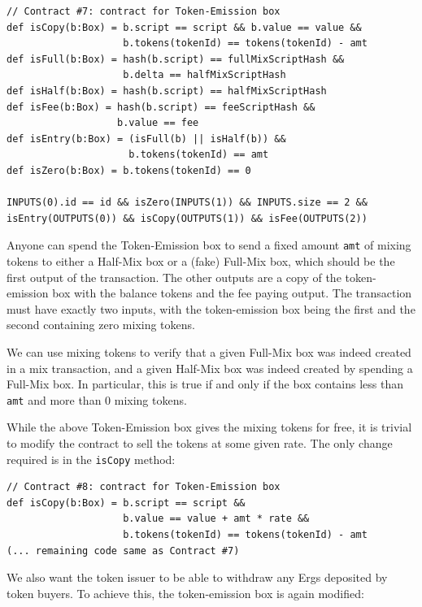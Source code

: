 \documentclass[11pt]{article}
\begin{document}
{\small
\begin{Verbatim}[frame=single]
// Contract #7: contract for Token-Emission box
def isCopy(b:Box) = b.script == script && b.value == value &&
                    b.tokens(tokenId) == tokens(tokenId) - amt
def isFull(b:Box) = hash(b.script) == fullMixScriptHash && 
                    b.delta == halfMixScriptHash
def isHalf(b:Box) = hash(b.script) == halfMixScriptHash
def isFee(b:Box) = hash(b.script) == feeScriptHash &&
                   b.value == fee
def isEntry(b:Box) = (isFull(b) || isHalf(b)) && 
                     b.tokens(tokenId) == amt
def isZero(b:Box) = b.tokens(tokenId) == 0

INPUTS(0).id == id && isZero(INPUTS(1)) && INPUTS.size == 2 &&
isEntry(OUTPUTS(0)) && isCopy(OUTPUTS(1)) && isFee(OUTPUTS(2))
\end{Verbatim}
}

Anyone can spend the Token-Emission box to send a fixed amount \texttt{amt} of mixing tokens to either a Half-Mix box or a (fake) Full-Mix box, which should be the first output of the transaction. The other outputs are a copy of the token-emission box with the balance tokens and the fee paying output. The transaction must have exactly two inputs, with the token-emission box being the first and the second containing zero mixing tokens. 

We can use mixing tokens to verify that a given Full-Mix box was indeed created in a mix transaction, and a given Half-Mix box was indeed created by spending a Full-Mix box. In particular, this is true if and only if the box contains less than \texttt{amt} and more than 0 mixing tokens.  

While the above Token-Emission box gives the mixing tokens for free, it is trivial to modify the contract to sell the tokens at some given rate. The only change required is in the \texttt{isCopy} method:

{\small
\begin{Verbatim}[frame=single]
// Contract #8: contract for Token-Emission box
def isCopy(b:Box) = b.script == script && 
                    b.value == value + amt * rate &&
                    b.tokens(tokenId) == tokens(tokenId) - amt
(... remaining code same as Contract #7)
\end{Verbatim}
}

We also want the token issuer to be able to withdraw any Ergs deposited by token buyers. To achieve this, the token-emission box is again modified:
\end{document}
